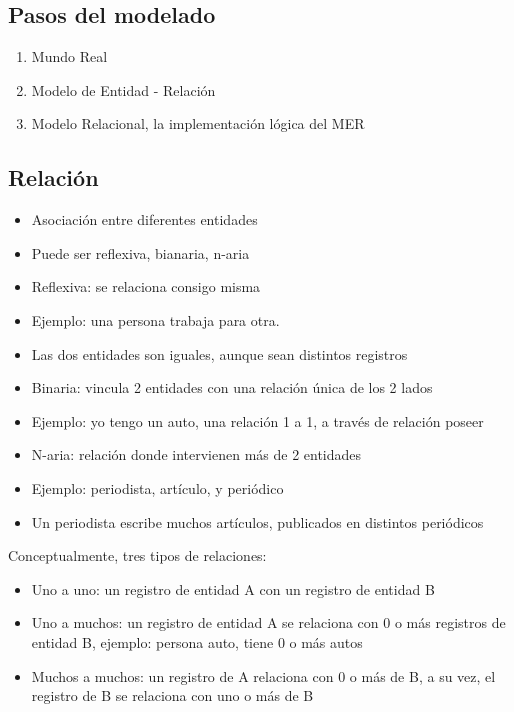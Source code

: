 \subsection{Pasos del modelado}
\begin{enumerate}
    \item Mundo Real 
    \item Modelo de Entidad - Relación 
    \item Modelo Relacional, la  implementación lógica del MER 
\end{enumerate}

\subsection{Relación}
\begin{itemize}
    \item Asociación entre diferentes entidades 
    \item Puede ser reflexiva, bianaria, n-aria
    \item Reflexiva: se relaciona consigo misma 
    \item Ejemplo: una persona trabaja para otra. 
    \item Las dos entidades son iguales, aunque sean distintos registros 
    \item Binaria: vincula 2 entidades con una relación única de los 2 lados
    \item Ejemplo: yo tengo un auto, una relación 1 a 1, a través de relación
    poseer 
    \item N-aria: relación donde intervienen más de 2 entidades
    \item Ejemplo: periodista, artículo, y periódico
    \item Un periodista escribe muchos artículos, 
    publicados en distintos periódicos
\end{itemize}

Conceptualmente, tres tipos de relaciones:
\begin{itemize}
    \item Uno a uno: un registro de entidad A con un registro de entidad B 
    \item Uno a muchos: un registro de entidad A se relaciona con 0 o más registros 
    de entidad B, ejemplo: persona auto, tiene 0 o más autos 
    \item Muchos a muchos: un registro de A relaciona con 0 o más de B, a su vez,
    el registro de B se relaciona con uno o más de B 
\end{itemize}

